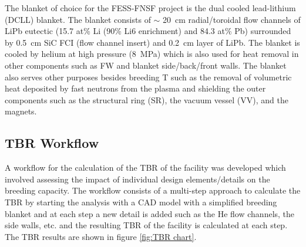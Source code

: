 \documentclass[12pt, letterpaper]{elsarticle}
\begin{document}
The blanket of choice for the FESS-FNSF project is the dual cooled lead-lithium (DCLL) \cite{ref_12} blanket. The blanket consists of $\sim$ \SI{20}{cm} radial/toroidal flow channels of LiPb eutectic (15.7 at\% Li (90\% Li6 enrichment) and 84.3 at\% Pb) surrounded by \SI{0.5}{cm} SiC FCI (flow channel insert) and \SI{0.2}{cm} layer of LiPb. The blanket is cooled by helium at high pressure (\SI{8}{MPa}) which is also used for heat removal in other components such as FW and blanket side/back/front walls. The blanket also serves other purposes besides breeding T such as the removal of volumetric heat deposited by fast neutrons from the plasma and shielding the outer components such as the structural ring (SR), the vacuum vessel (VV), and the magnets.

\subsection{TBR Workflow} \label{TBR Workflow}
A workflow for the calculation of the TBR of the facility was developed which involved assessing the impact of individual design elements/details on the breeding capacity. The workflow consists of a multi-step approach to calculate the TBR by starting the analysis with a CAD model with a simplified breeding blanket and at each step a new detail is added such as the He flow channels, the side walls, etc. and the resulting TBR of the facility is calculated at each step. The TBR results are shown in figure \ref{fig:TBR chart}. \vspace{5mm}
\end{document}
